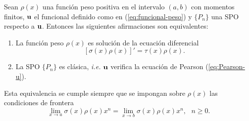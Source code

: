 \begin{lema}
    \label{lema:equivalencia-pearson}
    Sean $\rho(x)$ una función peso positiva en el intervalo $(a,b)$ con momentos finitos, $\mathbf{u}$ el funcional definido como en (\ref{eq:funcional-peso}) y $\{P_n\}$ una SPO respecto a $\mathbf{u}$. Entonces las siguientes afirmaciones son equivalentes: 
    \begin{enumerate}
        \item La función peso $\rho(x)$ es solución de la ecuación diferencial
        \begin{equation}
            \label{eq:Pearson-peso}
            [\sigma(x)\rho(x)]'=\tau(x)\rho(x).
        \end{equation}
        \item La SPO $\{P_n\}$ es clásica, \textit{i.e.} $\mathbf{u}$ verifica la ecuación de Pearson (\ref{eq:Pearson-u}).    
    \end{enumerate}
    Esta equivalencia se cumple siempre que se impongan sobre $\rho(x)$ las condiciones de frontera 
    \begin{equation}
        \label{eq:cond-frontera}
        \displaystyle\lim_{x\rightarrow a}\sigma(x)\rho(x)x^n = \displaystyle\lim_{x\rightarrow b}\sigma(x)\rho(x)x^n, \ \ \ n\geq 0.
    \end{equation}
\end{lema}
